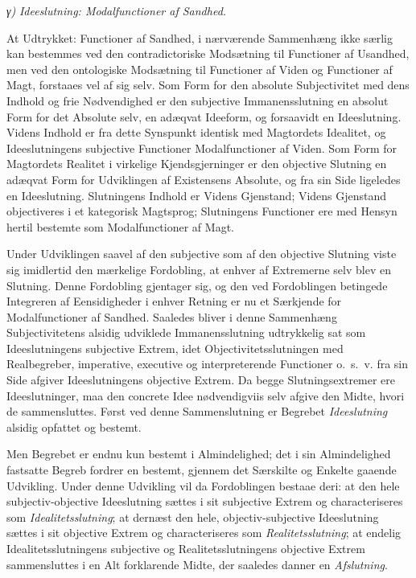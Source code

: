 \documentclass[12pt]{book}
\newcommand{\opage}[1]{\marginnote{\footnotesize\textit{[#1]}}}
\begin{document}
\medskip
\noindent\opage{434}\hspace*{1em}\textit{γ)} \emph{Ideeslutning: Modalfunctioner af Sandhed.}
\medskip

At Udtrykket: Functioner af Sandhed, i nærværende Sammenhæng ikke særlig kan bestemmes ved den contradictoriske Modsætning til Functioner af Usandhed, men ved den ontologiske Modsætning til Functioner af Viden og Functioner af Magt, forstaaes vel af sig selv. Som Form for den absolute Subjectivitet med dens Indhold og frie Nødvendighed er den subjective Immanensslutning en absolut Form for det Absolute selv, en adæqvat Ideeform, og forsaavidt en Ideeslutning. Videns Indhold er fra dette Synspunkt identisk med Magtordets Idealitet, og Ideeslutningens subjective Functioner Modalfunctioner af Viden. Som Form for Magtordets Realitet i virkelige Kjendsgjerninger er den objective Slutning en adæqvat Form for Udviklingen af Existensens Absolute, og fra sin Side ligeledes en Ideeslutning. Slutningens Indhold er Videns Gjenstand; Videns Gjenstand objectiveres i et kategorisk Magtsprog; Slutningens Functioner ere med Hensyn hertil bestemte som Modalfunctioner af Magt.

Under Udviklingen saavel af den subjective som af den objective Slutning viste sig imidlertid den mærkelige Fordobling, at enhver af Extremerne selv blev en Slutning. Denne Fordobling gjentager sig, og den ved Fordoblingen betingede Integreren af Eensidigheder i enhver Retning er nu et Særkjende for Modalfunctioner af Sandhed. Saaledes bliver i denne Sammenhæng Subjectivitetens alsidig udviklede Immanensslutning udtrykkelig sat som Ideeslutningens subjective Extrem, idet Objectivitetsslutningen med Realbegreber, imperative, executive og interpreterende Functioner o.~s.~v. fra sin Side afgiver Ideeslutningens objective Extrem. Da begge Slutningsextremer ere Ideeslutninger, maa den concrete Idee nødvendigviis selv afgive den Midte, hvori de sammensluttes. Først ved denne Sammenslutning er Begrebet \emph{Ideeslutning} alsidig opfattet og bestemt.

\opage{435}Men Begrebet er endnu kun bestemt i Almindelighed; det i sin Almindelighed fastsatte Begreb fordrer en bestemt, gjennem det Særskilte og Enkelte gaaende Udvikling. Under denne Udvikling vil da Fordoblingen bestaae deri: at den hele subjectiv-objective Ideeslutning sættes i sit subjective Extrem og characteriseres som \emph{Idealitetsslutning}; at dernæst den hele, objectiv-subjective Ideeslutning sættes i sit objective Extrem og characteriseres som \emph{Realitetsslutning}; at endelig Idealitetsslutningens subjective og Realitetsslutningens objective Extrem sammensluttes i en Alt forklarende Midte, der saaledes danner en \emph{Afslutning}.
\end{document}
